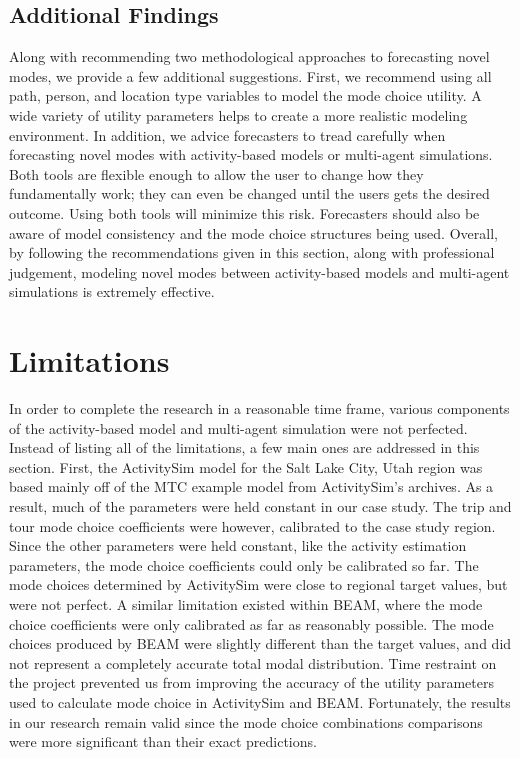 \documentclass[12pt, oneside, openright]{byuthesis}
\begin{document}
\hypertarget{additional-findings}{%
\section{Additional Findings}\label{additional-findings}}

Along with recommending two methodological approaches to forecasting novel modes, we provide a few additional suggestions. First, we recommend using all path, person, and location type variables to model the mode choice utility. A wide variety of utility parameters helps to create a more realistic modeling environment. In addition, we advice forecasters to tread carefully when forecasting novel modes with activity-based models or multi-agent simulations. Both tools are flexible enough to allow the user to change how they fundamentally work; they can even be changed until the users gets the desired outcome. Using both tools will minimize this risk. Forecasters should also be aware of model consistency and the mode choice structures being used. Overall, by following the recommendations given in this section, along with professional judgement, modeling novel modes between activity-based models and multi-agent simulations is extremely effective.

\hypertarget{limitations}{%
\chapter{Limitations}\label{limitations}}

In order to complete the research in a reasonable time frame, various components of the activity-based model and multi-agent simulation were not perfected. Instead of listing all of the limitations, a few main ones are addressed in this section. First, the ActivitySim model for the Salt Lake City, Utah region was based mainly off of the MTC example model from ActivitySim's archives. As a result, much of the parameters were held constant in our case study. The trip and tour mode choice coefficients were however, calibrated to the case study region. Since the other parameters were held constant, like the activity estimation parameters, the mode choice coefficients could only be calibrated so far. The mode choices determined by ActivitySim were close to regional target values, but were not perfect. A similar limitation existed within BEAM, where the mode choice coefficients were only calibrated as far as reasonably possible. The mode choices produced by BEAM were slightly different than the target values, and did not represent a completely accurate total modal distribution. Time restraint on the project prevented us from improving the accuracy of the utility parameters used to calculate mode choice in ActivitySim and BEAM. Fortunately, the results in our research remain valid since the mode choice combinations comparisons were more significant than their exact predictions.
\end{document}
